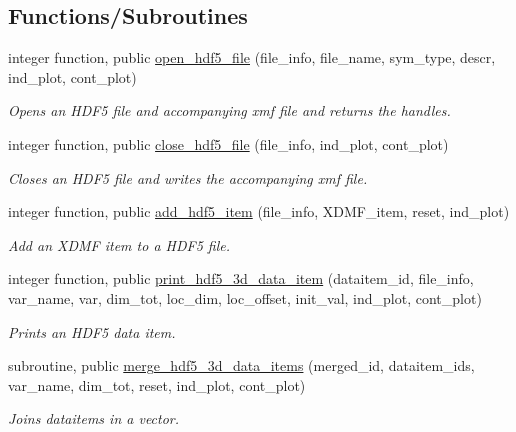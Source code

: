 \subsection*{Functions/\+Subroutines}
\begin{DoxyCompactItemize}
\item 
integer function, public \hyperlink{namespacehdf5__ops_a72c3974bb01858e1b232fc888d387bb6}{open\+\_\+hdf5\+\_\+file} (file\+\_\+info, file\+\_\+name, sym\+\_\+type, descr, ind\+\_\+plot, cont\+\_\+plot)
\begin{DoxyCompactList}\small\item\em Opens an H\+D\+F5 file and accompanying xmf file and returns the handles. \end{DoxyCompactList}\item 
integer function, public \hyperlink{namespacehdf5__ops_ad6c53fff55bd71f63470ca1e525ddb56}{close\+\_\+hdf5\+\_\+file} (file\+\_\+info, ind\+\_\+plot, cont\+\_\+plot)
\begin{DoxyCompactList}\small\item\em Closes an H\+D\+F5 file and writes the accompanying xmf file. \end{DoxyCompactList}\item 
integer function, public \hyperlink{namespacehdf5__ops_ade36dbd73b60da30e33a1059e590f734}{add\+\_\+hdf5\+\_\+item} (file\+\_\+info, X\+D\+M\+F\+\_\+item, reset, ind\+\_\+plot)
\begin{DoxyCompactList}\small\item\em Add an X\+D\+MF item to a H\+D\+F5 file. \end{DoxyCompactList}\item 
integer function, public \hyperlink{namespacehdf5__ops_ad794d069ca355f28536fba7e0d21bc13}{print\+\_\+hdf5\+\_\+3d\+\_\+data\+\_\+item} (dataitem\+\_\+id, file\+\_\+info, var\+\_\+name, var, dim\+\_\+tot, loc\+\_\+dim, loc\+\_\+offset, init\+\_\+val, ind\+\_\+plot, cont\+\_\+plot)
\begin{DoxyCompactList}\small\item\em Prints an H\+D\+F5 data item. \end{DoxyCompactList}\item 
subroutine, public \hyperlink{namespacehdf5__ops_a7b18b66402089eef2288b2d532f6af5d}{merge\+\_\+hdf5\+\_\+3d\+\_\+data\+\_\+items} (merged\+\_\+id, dataitem\+\_\+ids, var\+\_\+name, dim\+\_\+tot, reset, ind\+\_\+plot, cont\+\_\+plot)
\begin{DoxyCompactList}\small\item\em Joins dataitems in a vector. \end{DoxyCompactList}\item 

\end{DoxyCompactItemize}
